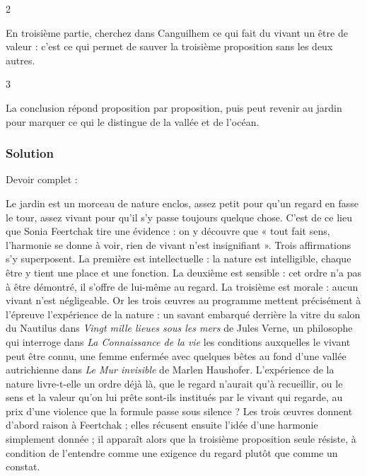 \documentclass[11pt,a4paper]{article}
\begin{document}
\begin{indication}{2}

En troisième partie, cherchez dans Canguilhem ce qui fait du vivant un être de valeur : c'est ce qui permet de sauver la troisième proposition sans les deux autres.

\end{indication}

\begin{indication}{3}

La conclusion répond proposition par proposition, puis peut revenir au jardin pour marquer ce qui le distingue de la vallée et de l'océan.

\end{indication}

\hypertarget{solution-7}{%
\subsubsection{Solution}\label{solution-7}}

Devoir complet :

Le jardin est un morceau de nature enclos, assez petit pour qu'un regard en fasse le tour, assez vivant pour qu'il s'y passe toujours quelque chose. C'est de ce lieu que Sonia Feertchak tire une évidence : on y découvre que « tout fait sens, l'harmonie se donne à voir, rien de vivant n'est insignifiant ». Trois affirmations s'y superposent. La première est intellectuelle : la nature est intelligible, chaque être y tient une place et une fonction. La deuxième est sensible : cet ordre n'a pas à être démontré, il s'offre de lui-même au regard. La troisième est morale : aucun vivant n'est négligeable. Or les trois œuvres au programme mettent précisément à l'épreuve l'expérience de la nature : un savant embarqué derrière la vitre du salon du Nautilus dans \emph{Vingt mille lieues sous les mers} de Jules Verne, un philosophe qui interroge dans \emph{La Connaissance de la vie} les conditions auxquelles le vivant peut être connu, une femme enfermée avec quelques bêtes au fond d'une vallée autrichienne dans \emph{Le Mur invisible} de Marlen Haushofer. L'expérience de la nature livre-t-elle un ordre déjà là, que le regard n'aurait qu'à recueillir, ou le sens et la valeur qu'on lui prête sont-ils institués par le vivant qui regarde, au prix d'une violence que la formule passe sous silence ? Les trois œuvres donnent d'abord raison à Feertchak ; elles récusent ensuite l'idée d'une harmonie simplement donnée ; il apparaît alors que la troisième proposition seule résiste, à condition de l'entendre comme une exigence du regard plutôt que comme un constat.
\end{document}
